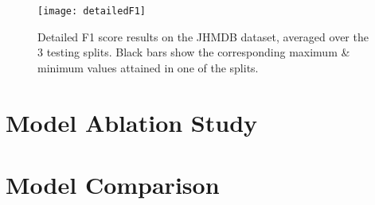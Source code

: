 \begin{figure}[h]
	\texttt{[image: detailedF1]}
	\centering
	\caption{Detailed F1 score results on the JHMDB dataset, averaged over the 3 testing splits. Black bars show the corresponding maximum \& minimum values attained in one of the splits.}
	\label{fig:detailed-f1}
\end{figure}

\section{Model Ablation Study}

\section{Model Comparison}